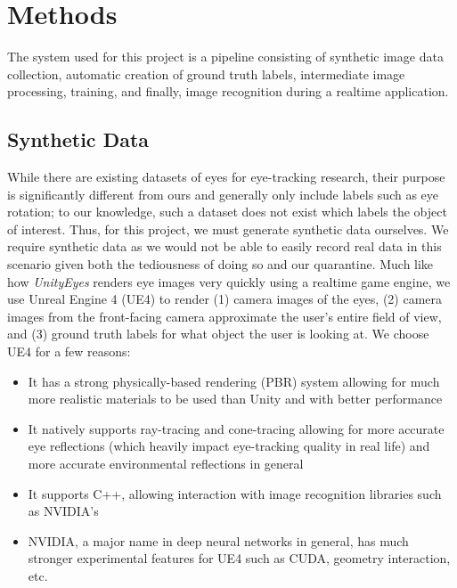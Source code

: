 \vspace{-1em}
\section{Methods}
The system used for this project is a pipeline consisting of synthetic image data collection, automatic creation of ground truth labels, intermediate image processing, training, and finally, image recognition during a realtime application.

\subsection{Synthetic Data}
\vspace{-1em}
While there are existing datasets of eyes for eye-tracking research, their purpose is significantly different from ours and generally only include labels such as eye rotation; to our knowledge, such a dataset does not exist which labels the object of interest. Thus, for this project, we must generate synthetic data ourselves. We require synthetic data as we would not be able to easily record real data in this scenario given both the tediousness of doing so and our quarantine.
\newline\indent Much like how \textit{UnityEyes} renders eye images very quickly using a realtime game engine, we use Unreal Engine 4 (UE4) to render (1) camera images of the eyes, (2) camera images from the front-facing camera approximate the user's entire field of view, and (3) ground truth labels for what object the user is looking at. We choose UE4 for a few reasons:
\begin{itemize}[leftmargin=*,noitemsep]
    \item It has a strong physically-based rendering (PBR) system allowing for much more realistic materials to be used than Unity and with better performance
    \item It natively supports ray-tracing and cone-tracing \cite{???} allowing for more accurate eye reflections (which heavily impact eye-tracking quality in real life) and more accurate environmental reflections in general
    \item It supports C++, allowing interaction with image recognition libraries such as NVIDIA's
    \item NVIDIA, a major name in deep neural networks in general, has much stronger experimental features for UE4 such as CUDA, geometry interaction, etc.
\end{itemize}
